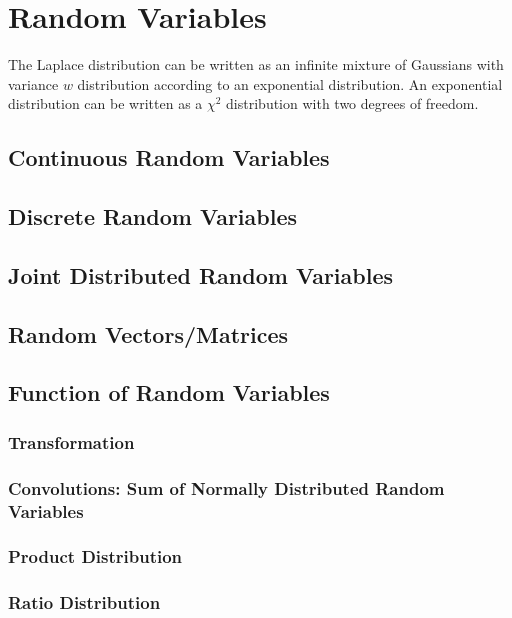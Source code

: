 \chapter{Random Variables}
The Laplace distribution can be written as an infinite mixture of Gaussians with variance $w$ distribution according to an exponential distribution. An exponential distribution can be written as a $\chi^2$ distribution with two degrees of freedom.
\section{Continuous Random Variables}
\section{Discrete Random Variables}
\section{Joint Distributed Random Variables}
\section{Random Vectors/Matrices}
\section{Function of Random Variables}
\subsection{Transformation}
\subsection{Convolutions: Sum of Normally Distributed Random Variables}
\subsection{Product Distribution}
\subsection{Ratio Distribution}